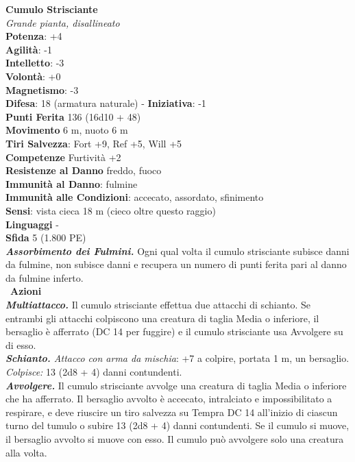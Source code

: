 \begin{multicols}{2}
\medskip\textbf{Cumulo Strisciante}\\
\emph{Grande pianta, disallineato}\\
\textbf{Potenza}: +4\\
\textbf{Agilità}: -1\\
\textbf{Intelletto}: -3\\
\textbf{Volontà}: +0\\
\textbf{Magnetismo}: -3\\
\textbf{Difesa}: 18 (armatura naturale) - \textbf{Iniziativa}: -1\\
\textbf{Punti Ferita} 136 (16d10 + 48)\\
\textbf{Movimento} 6 m, nuoto 6 m\\
\textbf{Tiri Salvezza}: Fort +9, Ref +5, Will +5\\
\textbf{Competenze} Furtività +2\\
\textbf{Resistenze al Danno} freddo, fuoco\\
\textbf{Immunità al Danno}: fulmine\\
\textbf{Immunità alle Condizioni}: accecato, assordato, sfinimento\\
\textbf{Sensi}: vista cieca 18 m (cieco oltre questo raggio)\\
\textbf{Linguaggi} -\\
\textbf{Sfida} 5 (1.800 PE)\smallskip\\
\emph{\textbf{Assorbimento dei Fulmini.}} Ogni qual volta il cumulo strisciante subisce danni da fulmine, non subisce danni e recupera un numero di punti ferita pari al danno da fulmine inferto.\\\
\smallskip\textbf{Azioni}\\
\emph{\textbf{Multiattacco.}} Il cumulo strisciante effettua due attacchi di schianto. Se entrambi gli attacchi colpiscono una creatura di taglia Media o inferiore, il bersaglio è afferrato (DC 14 per fuggire) e il cumulo strisciante usa Avvolgere su di esso.\\
\emph{\textbf{Schianto.} Attacco con arma da mischia}: +7 a colpire, portata 1 m, un bersaglio.\\
\emph{Colpisce:} 13 (2d8 + 4) danni contundenti.\\
\emph{\textbf{Avvolgere.}} Il cumulo strisciante avvolge una creatura di taglia Media o inferiore che ha afferrato. Il bersaglio avvolto è accecato, intralciato e impossibilitato a respirare, e deve riuscire un tiro salvezza su Tempra DC 14 all'inizio di ciascun turno del tumulo o subire 13 (2d8 + 4) danni contundenti. Se il cumulo si muove, il bersaglio avvolto si muove con esso. Il cumulo può avvolgere solo una creatura alla volta.\\

\end{multicols}
